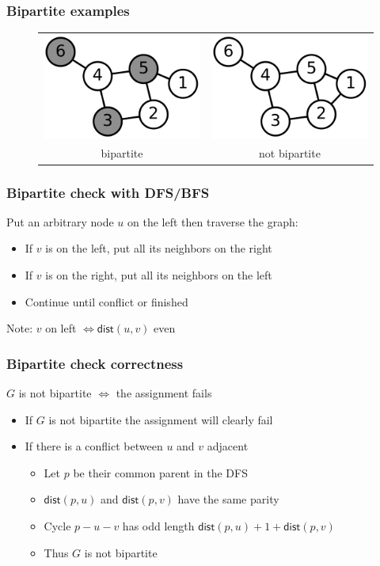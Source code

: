 \documentclass[12pt]{beamer}
\begin{document}
\begin{frame}
\frametitle{Bipartite examples}
\begin{figure}
\centering
\begin{tabular}{cc}
\includegraphics[width=0.4\linewidth]{img/6n-bipartite}
& \includegraphics[width=0.4\linewidth]{img/6n-graph} \\
bipartite & not bipartite
\end{tabular}
\end{figure}
\end{frame}

\begin{frame}
\frametitle{Bipartite check with DFS/BFS}
Put an arbitrary node $u$ on the left then traverse the graph:
\begin{itemize}
\item If $v$ is on the left, put all its neighbors on the right
\item If $v$ is on the right, put all its neighbors on the left
\item Continue until conflict or finished
\end{itemize}
Note: $v$ on left $\Leftrightarrow \mathsf{dist}(u,v)$ even
\end{frame}

\begin{frame}
\frametitle{Bipartite check correctness}
$G$ is not bipartite $\Leftrightarrow$ the assignment fails
\begin{itemize}
\item If $G$ is not bipartite the assignment will clearly fail
\item If there is a conflict between $u$ and $v$ adjacent
    \begin{itemize}
    \item Let $p$ be their common parent in the DFS
    \item $\mathsf{dist}(p,u)$ and $\mathsf{dist}(p,v)$ have the same parity
    \item Cycle $p-u-v$ has odd length $\mathsf{dist}(p,u) + 1 + \mathsf{dist}(p,v)$
    \item Thus $G$ is not bipartite
    \end{itemize}
\end{itemize}
\end{frame}
\end{document}
